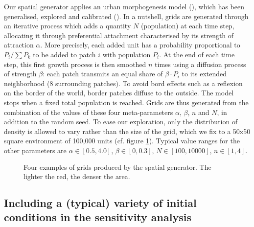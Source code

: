 \documentclass[Afour,sageh,times]{sagej}
\begin{document}
Our spatial generator applies an urban morphogenesis model (\cite{Batty2007}), which has been generalised, explored and calibrated (\cite{Raimbault2014}). In a nutshell, grids are generated through an iterative process which adds a quantity $N$ (population) at each time step, allocating it through preferential attachment characterised by its strength of attraction $\alpha$. More precisely, each added unit has a probability proportional to $P_i/\sum P_k$ to be added to patch $i$ with population $P_i$. At the end of each time step, this first growth process is then smoothed $n$ times using a diffusion process of strength $\beta$: each patch transmits an equal share of $\beta\cdot P_i$ to its extended neighborhood (8 surrounding patches). To avoid bord effects such as a reflexion on the border of the world, border patches diffuse to the outside.  The model stops when a fixed total population is reached. Grids are thus generated from the combination of the values of these four meta-parameters $\alpha$, $\beta$, $n$ and $N$, in addition to the random seed. To ease our exploration, only the distribution of density is allowed to vary rather than the size of the grid, which we fix to a 50x50 square environment of 100,000 units (cf. figure \ref{fig:spatialGen}). Typical value ranges for the other parameters are $\alpha\in\left[0.5,4.0\right]$, $\beta \in\left[0,0.3\right] $, $N\in \left[100,10000\right]$, $n\in\left[1,4\right]$.



\begin{figure}[htbp] \begin{center} 
 \caption{Four examples of grids produced by the spatial generator. The lighter the red, the denser the area.} \label{fig:spatialGen} \end{center} \end{figure} %


\subsection{Including a (typical) variety of initial conditions in the sensitivity analysis}
\end{document}
